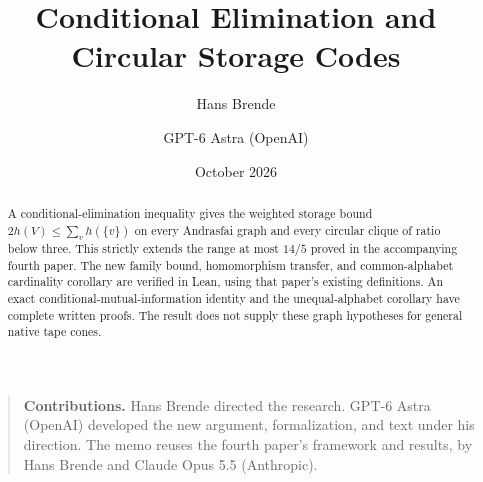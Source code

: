\documentclass[11pt]{article}
\title{Conditional Elimination and Circular Storage Codes}
\author{Hans Brende \and GPT-6 Astra (OpenAI)}
\date{October 2026}
\numberwithin{equation}{section}
\begin{document}
\maketitle
\begin{abstract}
A conditional-elimination inequality gives the weighted storage bound
$2h(V)\le\sum_v h(\{v\})$ on every Andrasfai graph and every circular
clique of ratio below three. This strictly extends the range at most
$14/5$ proved in the accompanying fourth paper. The new family bound,
homomorphism transfer, and common-alphabet cardinality corollary are
verified in Lean, using that paper's existing definitions. An exact
conditional-mutual-information identity and the unequal-alphabet
corollary have complete written proofs. The result does not supply
these graph hypotheses for general native tape cones.
\end{abstract}
\begin{quote}\small
\textbf{Contributions.} Hans Brende directed the research. GPT-6 Astra
(OpenAI) developed the new argument, formalization, and text under his
direction. The memo reuses the fourth paper's framework and results,
by Hans Brende and Claude Opus 5.5 (Anthropic).
\end{quote}

\appendix




\end{document}
